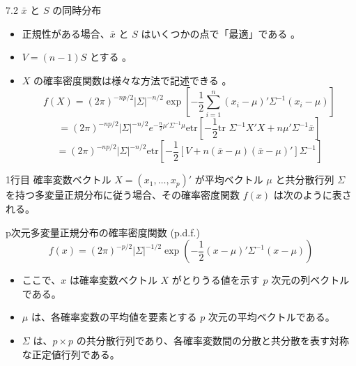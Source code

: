 \documentclass[aspectratio=169]{beamer}
\begin{document}
\begin{frame}{7.2 $\bar{x}$ と $S$ の同時分布}
\begin{itemize}
    \item 正規性がある場合、$\bar{x}$ と $S$ はいくつかの点で「最適」である 。
    \item $V=(n-1)S$ とする 。
    \item $X$ の確率密度関数は様々な方法で記述できる 。
    \begin{equation*}
    f(X) = (2\pi)^{-np/2} |\Sigma|^{-n/2} \exp\left[-\frac{1}{2} \sum_{i=1}^{n} (x_i - \mu)' \Sigma^{-1} (x_i - \mu)\right] \tag{7.1}
    \end{equation*}
    \begin{equation*}
    = (2\pi)^{-np/2} |\Sigma|^{-n/2} e^{-\frac{n}{2}\mu'\Sigma^{-1}\mu} \text{etr}\left[-\frac{1}{2}\text{tr }\Sigma^{-1}X'X + n\mu'\Sigma^{-1}\bar{x}\right] 
    \end{equation*}
    \begin{equation*}
    = (2\pi)^{-np/2} |\Sigma|^{-n/2} \text{etr}\left[-\frac{1}{2}[V + n(\bar{x} - \mu)(\bar{x} - \mu)']\Sigma^{-1}\right] 
    \end{equation*}
\end{itemize}
\end{frame}

\begin{frame}{1行目}
確率変数ベクトル $X = (x_1, \dots, x_p)'$ が平均ベクトル $\mu$ と共分散行列 $\Sigma$ を持つ多変量正規分布に従う場合、その確率密度関数 $f(x)$ は次のように表される。
\begin{block}{p次元多変量正規分布の確率密度関数 (p.d.f.)}
\begin{equation*}
f(x) = (2\pi)^{-p/2} |\Sigma|^{-1/2} \exp\left(-\frac{1}{2}(x - \mu)'\Sigma^{-1}(x - \mu)\right)
\end{equation*}
\end{block}
\begin{itemize}
\item ここで、$x$ は確率変数ベクトル $X$ がとりうる値を示す $p$ 次元の列ベクトルである。
\item $\mu$ は、各確率変数の平均値を要素とする $p$ 次元の平均ベクトルである。
\item $\Sigma$ は、$p \times p$ の共分散行列であり、各確率変数間の分散と共分散を表す対称な正定値行列である。
\end{itemize}
\end{frame}
\end{document}
